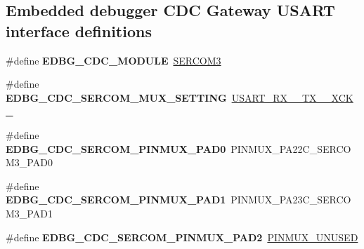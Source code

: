 \subsection*{Embedded debugger C\+D\+C Gateway U\+S\+A\+R\+T interface definitions}
\begin{DoxyCompactItemize}
\item 
\hypertarget{group__saml21__xplained__pro__features__group_gaf0fcea2c93da3103a5034f7acf880199}{}\#define {\bfseries E\+D\+B\+G\+\_\+\+C\+D\+C\+\_\+\+M\+O\+D\+U\+L\+E}~\hyperlink{group___s_a_m_l21_j18_a__base_gac9f8240be5a40b46cb09617323ebc7e3}{S\+E\+R\+C\+O\+M3}\label{group__saml21__xplained__pro__features__group_gaf0fcea2c93da3103a5034f7acf880199}

\item 
\hypertarget{group__saml21__xplained__pro__features__group_gaf280711d231595500e625f8bd55b2f86}{}\#define {\bfseries E\+D\+B\+G\+\_\+\+C\+D\+C\+\_\+\+S\+E\+R\+C\+O\+M\+\_\+\+M\+U\+X\+\_\+\+S\+E\+T\+T\+I\+N\+G}~\hyperlink{group__asfdoc__sam0__sercom__usart__group_gga87bbdb9f7edb3f1866aeb498bf7c9077ac937b1e1063cc3d094c4534c022af703}{U\+S\+A\+R\+T\+\_\+\+R\+X\+\_\+\_\+\+T\+X\+\_\+\_\+\+X\+C\+K\+\_}\label{group__saml21__xplained__pro__features__group_gaf280711d231595500e625f8bd55b2f86}

\item 
\hypertarget{group__saml21__xplained__pro__features__group_gaf52beac6e5e72322ef2a4efc0f0061fd}{}\#define {\bfseries E\+D\+B\+G\+\_\+\+C\+D\+C\+\_\+\+S\+E\+R\+C\+O\+M\+\_\+\+P\+I\+N\+M\+U\+X\+\_\+\+P\+A\+D0}~P\+I\+N\+M\+U\+X\+\_\+\+P\+A22\+C\+\_\+\+S\+E\+R\+C\+O\+M3\+\_\+\+P\+A\+D0\label{group__saml21__xplained__pro__features__group_gaf52beac6e5e72322ef2a4efc0f0061fd}

\item 
\hypertarget{group__saml21__xplained__pro__features__group_gaa26f39433a2bdb405244a93fc4a9a09f}{}\#define {\bfseries E\+D\+B\+G\+\_\+\+C\+D\+C\+\_\+\+S\+E\+R\+C\+O\+M\+\_\+\+P\+I\+N\+M\+U\+X\+\_\+\+P\+A\+D1}~P\+I\+N\+M\+U\+X\+\_\+\+P\+A23\+C\+\_\+\+S\+E\+R\+C\+O\+M3\+\_\+\+P\+A\+D1\label{group__saml21__xplained__pro__features__group_gaa26f39433a2bdb405244a93fc4a9a09f}

\item 
\hypertarget{group__saml21__xplained__pro__features__group_ga1ad050d87b5fbd7ff982782cdd690259}{}\#define {\bfseries E\+D\+B\+G\+\_\+\+C\+D\+C\+\_\+\+S\+E\+R\+C\+O\+M\+\_\+\+P\+I\+N\+M\+U\+X\+\_\+\+P\+A\+D2}~\hyperlink{group__asfdoc__sam0__sercom__usart__group_gaffde9ff712058ef836127e1f3368889e}{P\+I\+N\+M\+U\+X\+\_\+\+U\+N\+U\+S\+E\+D}\label{group__saml21__xplained__pro__features__group_ga1ad050d87b5fbd7ff982782cdd690259}


\end{DoxyCompactItemize}
